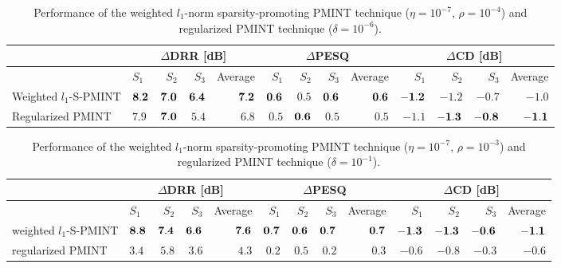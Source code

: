 \documentclass[10pt]{IEEEtran}
\begin{document}
\begin{table}[t!]
\begin{center}
  \caption{Performance of the weighted $l_1$-norm sparsity-promoting PMINT technique ($\eta = 10^{-7}$, $\rho = 10^{-4}$) and regularized PMINT technique ($\delta = 10^{-6}$).}
  \label{tbl: spa_reg1}
  \begin{tabularx}{\linewidth}{X|lrrr|rrrr|rrrr|}
    \toprule
    & \multicolumn{4}{c|}{$\Delta$DRR [dB]} & \multicolumn{4}{c|}{$\Delta$PESQ} & \multicolumn{4}{c|}{$\Delta$CD [dB]} \\
    \midrule
      & $S_1$ & $S_2$ & $S_3$ & Average& $S_1$ & $S_2$ & $S_3$ & Average &  $S_1$ & $S_2$ & $S_3$ & Average\\
    \midrule
      Weighted $l_1$-S-PMINT & $\bf{8.2}$ & $\bf{7.0}$ & $\bf{6.4}$ &$\bf 7.2$ & $\bf{0.6}$ & $0.5$ & $\bf{0.6}$ & $\bf 0.6$ & $\bf{-1.2}$ & $-1.2$ & $-0.7$ & $-1.0$\\
      Regularized PMINT & $7.9$ & $\bf{7.0}$ & $5.4$ & $6.8$ & ${0.5}$ & $\bf{0.6}$ & ${0.5}$ & $0.5$ & $-1.1$ & $\bf{-1.3}$ & $\bf{-0.8}$ & $\bf -1.1$\\
    \bottomrule
  \end{tabularx}
\end{center}
\end{table}
\begin{table}[t!]
\begin{center}
  \caption{Performance of the weighted $l_1$-norm sparsity-promoting PMINT technique ($\eta = 10^{-7}$, $\rho = 10^{-3}$) and regularized PMINT technique ($\delta = 10^{-1}$).}
  \label{tbl: spa_reg2}
  \begin{tabularx}{\linewidth}{X|lrrr|rrrr|rrrr|}
    \toprule
    & \multicolumn{4}{c|}{$\Delta$DRR [dB]} & \multicolumn{4}{c|}{$\Delta$PESQ} & \multicolumn{4}{c|}{$\Delta$CD [dB]} \\
    \midrule
      & $S_1$ & $S_2$ & $S_3$ & Average& $S_1$ & $S_2$ & $S_3$ & Average &  $S_1$ & $S_2$ & $S_3$ & Average\\
    \midrule
      weighted $l_1$-S-PMINT & $\bf{8.8}$ & $\bf{7.4}$ & $\bf{6.6}$ & $\bf 7.6$  & $\bf{0.7}$ & $\bf{0.6}$ & $\bf{0.7}$ & $\bf{0.7}$ & $\bf{-1.3}$ & $\bf{-1.3}$ & $\bf{-0.6}$ & $\bf -1.1$\\
      regularized PMINT & $3.4$ & $5.8$ & $3.6$ & $4.3$ & $0.2$ & $0.5$ & $0.2$ & $0.3$ & $-0.6$ & $-0.8$ & $-0.3$ & $-0.6$\\
    \bottomrule
  \end{tabularx}
\end{center}
\end{table}
\end{document}
